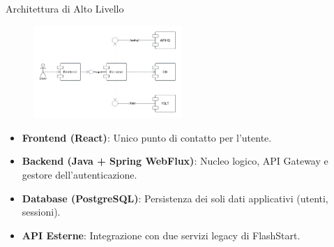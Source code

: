 \documentclass[8pt]{beamer}
\begin{document}
\begin{frame}{Architettura di Alto Livello}
  \begin{figure}
    \includegraphics[width=0.5\textwidth]{figures/components.pdf}
  \end{figure}
  \begin{itemize}
    \item \textbf{Frontend (React)}: Unico punto di contatto per l'utente.
    \item \textbf{Backend (Java + Spring WebFlux)}: Nucleo logico, API Gateway e gestore dell'autenticazione.
    \item \textbf{Database (PostgreSQL)}: Persistenza dei soli dati applicativi (utenti, sessioni).
    \item \textbf{API Esterne}: Integrazione con due servizi legacy di FlashStart.
  \end{itemize}
\end{frame}
\end{document}
